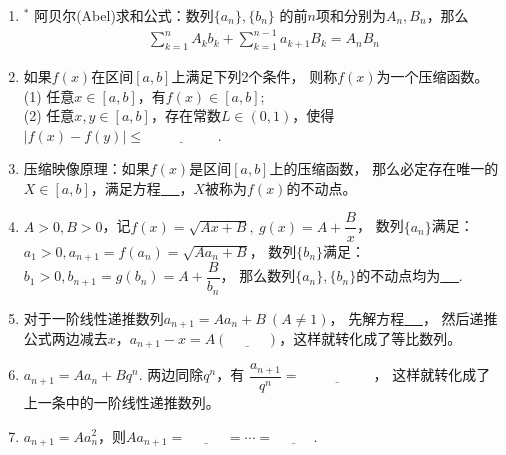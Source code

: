 \documentclass{article}
\newif\ifte
\renewcommand\leq\leqslant
\begin{document}
\begin{multicols}{2}
\begin{enumerate}[leftmargin=20pt]
\item $^*$ 阿贝尔(Abel)求和公式：数列$ \{a_n\},\{b_n\} $
的前$ n $项和分别为$ A_n,B_n $，那么
\begin{gather}
    \sum_{k=1}^{n}A_kb_k+\sum_{k=1}^{n-1}a_{k+1}B_k=A_n B_n 
\end{gather}

\item 如果$ f(x) $在区间$ [a,b] $上满足下列2个条件，
则称$ f(x) $为一个压缩函数。\\
(1) 任意$ x\in [a,b] $，有$ f(x)\in [a,b] $;  \\
(2) 任意$ x,y\in [a,b] $，存在常数$ L\in(0,1) $，使得
$ |f(x)-f(y)|\leq \underline{\ \ifte L|x-y|\else \hspace{2cm} \fi\ } $.

\item 压缩映像原理：如果$ f(x) $是区间$ [a,b] $上的压缩函数，
那么必定存在唯一的$ X\in[a,b] $，满足方程\underline{\ \ifte 
$ X=f(X) $ \else \hspace{2cm} \fi\ }，$ X $被称为$ f(x) $的不动点。

\item $ A>0,B>0 $，记$ f(x)=\sqrt{Ax+B},\ g(x)=A+\dfrac{B}{x} $，
数列$ \{a_n\} $满足：$ a_1>0,a_{n+1}=f(a_n)=\sqrt{Aa_n+B} $，
数列$ \{b_n\} $满足：$ b_1>0,b_{n+1}=g(b_n)=A+\dfrac{B}{b_n} $，
那么数列$ \{a_n\},\{b_n\} $的不动点均为\underline{\ \ifte 
 $ \dfrac{A+\sqrt{A^2+4B}}{2} $ \else \hspace{2cm} \fi\ }. 

\item 对于一阶线性递推数列$ a_{n+1}=Aa_{n}+B\ (A\neq 1) $，
先解方程\underline{\ \ifte $ x=Ax+B $\else \hspace{2cm} \fi\ }，
然后递推公式两边减去$ x $，$ a_{n+1}-x=A(\underline{\ \ifte 
a_{n}-x \else \hspace{1cm} \fi\ }) $，这样就转化成了等比数列。

\item $ a_{n+1}=Aa_{n}+Bq^n $. 两边同除$ q^n $，有
$ \dfrac{a_{n+1}}{q^n}=\underline{\ \ifte 
\dfrac{A}{q}\dfrac{a_n}{q^{n-1}}+B\else \hspace{2cm} \fi\ } $，
这样就转化成了上一条中的一阶线性递推数列。

\item $ a_{n+1}=Aa_n^2 $，则$ Aa_{n+1}=\underline{\ \ifte 
(Aa_{n})^2 \else \hspace{1cm} \fi\ }=\cdots=\underline{\ \ifte
(Aa_1)^{2^{n}} \else \hspace{1cm} \fi\ } $. 


\end{enumerate}
\end{multicols}
\end{document}
